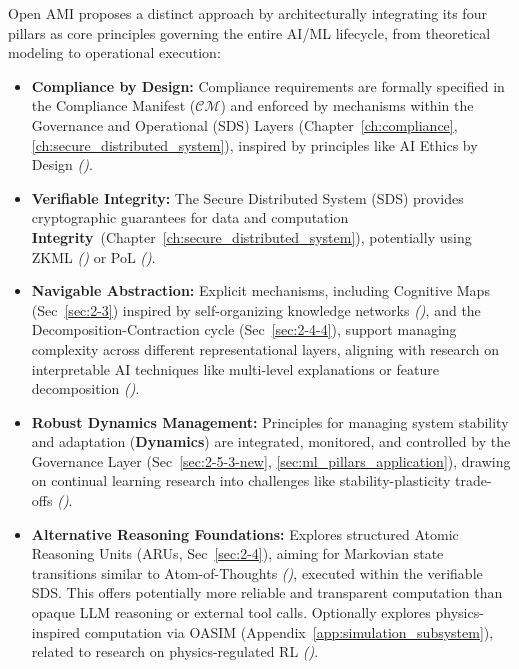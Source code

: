 \documentclass[12pt,a4paper]{report}
\renewcommand{\citep}[1]{\textit{\scriptsize{(\cite{#1})}}}
\newcommand{\Integrity}{\textbf{Integrity}}
\newcommand{\Dynamics}{\textbf{Dynamics}}
\begin{document}
	Open AMI proposes a distinct approach by architecturally integrating its four pillars as core principles governing the entire AI/ML lifecycle, from theoretical modeling to operational execution:
	
	\begin{itemize}[noitemsep]
		\item \textbf{Compliance by Design:} Compliance requirements are formally specified in the Compliance Manifest ($\mathcal{CM}$) and enforced by mechanisms within the Governance and Operational (SDS) Layers (Chapter~\ref{ch:compliance}, \ref{ch:secure_distributed_system}), inspired by principles like AI Ethics by Design \citep{Sekrst2024Guardrails}.
		\newline
		\item \textbf{Verifiable Integrity:} The Secure Distributed System (SDS) provides cryptographic guarantees for data and computation \Integrity\ (Chapter~\ref{ch:secure_distributed_system}), potentially using ZKML \citep{Peng2025ZKMLSurvey} or PoL \citep{Jia2021ProofOfLearning}.
		\newline
		\item \textbf{Navigable Abstraction:} Explicit mechanisms, including Cognitive Maps (Sec~\ref{sec:2-3}) inspired by self-organizing knowledge networks \citep{Buehler2025AgenticGraphRef}, and the Decomposition-Contraction cycle (Sec~\ref{sec:2-4-4}), support managing complexity across different representational layers, aligning with research on interpretable AI techniques like multi-level explanations or feature decomposition \citep{AdditionalCitationRef22, AdditionalCitationRef15}.
		\newline
		\item \textbf{Robust Dynamics Management:} Principles for managing system stability and adaptation (\Dynamics) are integrated, monitored, and controlled by the Governance Layer (Sec~\ref{sec:2-5-3-new}, \ref{sec:ml_pillars_application}), drawing on continual learning research into challenges like stability-plasticity trade-offs \citep{Wang2024ContinualLearningSurvey}.
		\newline
		\item \textbf{Alternative Reasoning Foundations:} Explores structured Atomic Reasoning Units (ARUs, Sec~\ref{sec:2-4}), aiming for Markovian state transitions similar to Atom-of-Thoughts \citep{Teng2025AtomOfThoughtsRef}, executed within the verifiable SDS. This offers potentially more reliable and transparent computation than opaque LLM reasoning or external tool calls. Optionally explores physics-inspired computation via OASIM (Appendix~\ref{app:simulation_subsystem}), related to research on physics-regulated RL \citep{Cao_PhyDRL_2024}.

\end{itemize}
\end{document}
